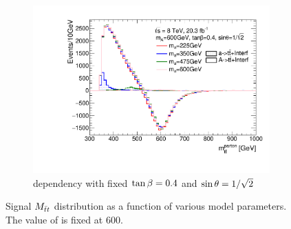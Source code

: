 \begin{figure}
\begin{subfigure}[b]{0.49\textwidth}
\includegraphics[width=\textwidth]{texinputs/04_grid/figures/ttres/ttres_2HDMa_A_ma.pdf}
\caption{\ma dependency with fixed $\tan\beta=0.4$ and $\sin\theta=1/\sqrt{2}$}
\end{subfigure}
\caption{Signal $M_{\bar{t}t}$ distribution as a function of various model parameters. The value of \mA is fixed at 600\GeV.}
\label{fig:ttres_2HDM_A}
\end{figure}
\FloatBarrier

